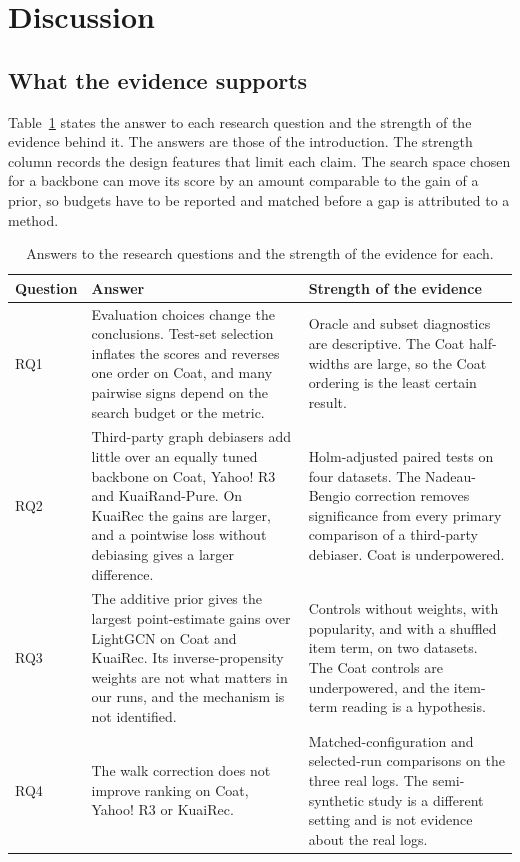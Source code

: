 \section{Discussion}\label{sec:discussion}

\subsection{What the evidence supports}\label{sec:disc-support}

Table~\ref{tab:answers} states the answer to each research question and the strength of the evidence behind it. The
answers are those of the introduction. The strength column records the design features that limit each claim. The
search space chosen for a backbone can move its score by an amount comparable to the gain of a prior, so budgets have
to be reported and matched before a gap is attributed to a method.

\begin{table}[htbp]\centering\footnotesize
\caption{Answers to the research questions and the strength of the evidence for each.}\label{tab:answers}
\begin{tabular}{p{1.9cm}p{6.4cm}p{5.6cm}}
\toprule
Question & Answer & Strength of the evidence \\
\midrule
RQ1 & Evaluation choices change the conclusions. Test-set selection inflates the scores and reverses one order on Coat, and many pairwise signs depend on the search budget or the metric. & Oracle and subset diagnostics are descriptive. The Coat half-widths are large, so the Coat ordering is the least certain result. \\
RQ2 & Third-party graph debiasers add little over an equally tuned backbone on Coat, Yahoo! R3 and KuaiRand-Pure. On KuaiRec the gains are larger, and a pointwise loss without debiasing gives a larger difference. & Holm-adjusted paired tests on four datasets. The Nadeau-Bengio correction removes significance from every primary comparison of a third-party debiaser. Coat is underpowered. \\
RQ3 & The additive prior gives the largest point-estimate gains over LightGCN on Coat and KuaiRec. Its inverse-propensity weights are not what matters in our runs, and the mechanism is not identified. & Controls without weights, with popularity, and with a shuffled item term, on two datasets. The Coat controls are underpowered, and the item-term reading is a hypothesis. \\
RQ4 & The walk correction does not improve ranking on Coat, Yahoo! R3 or KuaiRec. & Matched-configuration and selected-run comparisons on the three real logs. The semi-synthetic study is a different setting and is not evidence about the real logs. \\
\bottomrule
\end{tabular}
\end{table}

